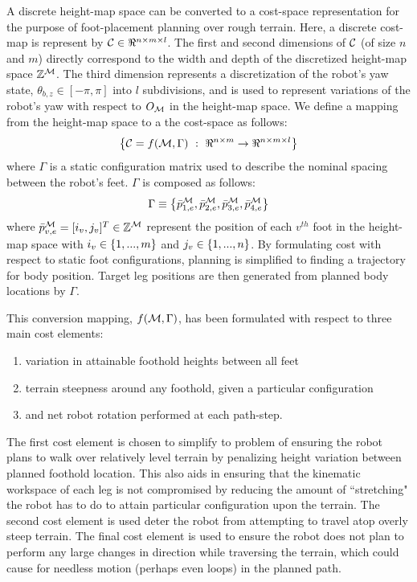 			A discrete height-map space can be converted to a cost-space representation for the purpose of foot-placement planning over rough terrain. Here, a discrete cost-map is represent by ${\cal C}\in\Re^{n\times m\times l}$. The first and second dimensions of ${\cal C}$ (of size $n$ and $m$) directly correspond to the width and depth of the discretized height-map space $\mathbb{Z}^{{\cal M}}$. The third dimension represents a discretization of the robot's yaw state, $\theta_{b,z}\in[-\pi,\pi]$ into $l$ subdivisions, and is used to represent variations of the robot's yaw with respect to $O_{{\cal M}}$ in the height-map space. We define a mapping from the height-map space to a the cost-space as follows:
				\begin{equation}
					\left\{ {\cal C} = f({\cal M},\Gamma)\text{ }:\text{ }\Re^{n\times m} \rightarrow \Re^{n\times m \times l} \right\}
					\label{eq::cost_mapping}
				\end{equation}
			where $\Gamma$ is a static configuration matrix used to describe the nominal spacing between the robot's feet. $\Gamma$ is composed as follows:
				\begin{equation*}
					\Gamma \equiv \left\{\bar{p}_{1,e}^{{\cal M}},\bar{p}_{2,e}^{{\cal M}},\bar{p}_{3,e}^{{\cal M}},\bar{p}_{4,e}^{{\cal M}}\right\}
					\label{eq::cost_gamma}
				\end{equation*}
			where $\bar{p}_{v,e}^{{\cal M}}=[i_{v},j_{v}]^{T}\in{\Bbb Z}^{{\cal M}}$ represent the position of each $v^{th}$ foot in the height-map space with $i_{v}\in \left\{1,...,m\right\}$ and $j_{v}\in\left\{1,...,n\right\}$. By formulating cost with respect to static foot configurations, planning is simplified to finding a trajectory for body position. Target leg positions are then generated from planned body locations by $\Gamma$.

			This conversion mapping, $f({\cal M},\Gamma)$, has been formulated with respect to three main cost elements:
				\begin{enumerate}
					\item variation in attainable foothold heights between all feet
					\item terrain steepness around any foothold, given a particular configuration
					\item and net robot rotation performed at each path-step.
				\end{enumerate}
			The first cost element is chosen to simplify to problem of ensuring the robot plans to walk over relatively level terrain by penalizing height variation between planned foothold location. This also aids in ensuring that the kinematic workspace of each leg is not compromised by reducing the amount of ``stretching" the robot has to do to attain particular configuration upon the terrain. The second cost element is used deter the robot from attempting to travel atop overly steep terrain. The final cost element is used to ensure the robot does not plan to perform any large changes in direction while traversing the terrain, which could cause for needless motion (perhaps even loops) in the planned path. 

